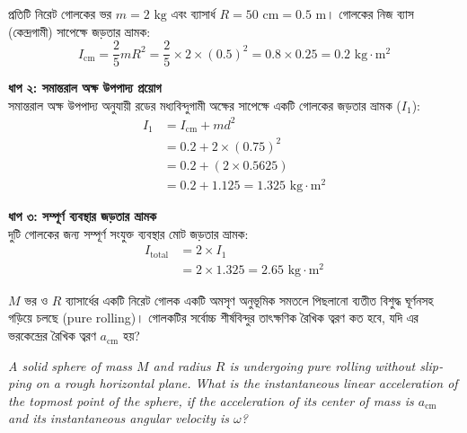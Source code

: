 \documentclass[12pt, a4paper]{article}
\begin{document}
{\begin{tcolorbox}[solutionbox={সমাধান (Solution)}]
    প্রতিটি নিরেট গোলকের ভর $m = 2\text{ kg}$ এবং ব্যাসার্ধ $R = 50\text{ cm} = 0.5\text{ m}$। 
    গোলকের নিজ ব্যাস (কেন্দ্রগামী) সাপেক্ষে জড়তার ভ্রামক:
    \[ I_{\text{cm}} = \frac{2}{5} m R^2 = \frac{2}{5} \times 2 \times (0.5)^2 = 0.8 \times 0.25 = 0.2\text{ kg}\cdot\text{m}^2 \]
    
    \vspace{0.5em}
    \noindent\textbf{ধাপ ২: সমান্তরাল অক্ষ উপপাদ্য প্রয়োগ} \\
    সমান্তরাল অক্ষ উপপাদ্য অনুযায়ী রডের মধ্যবিন্দুগামী অক্ষের সাপেক্ষে একটি গোলকের জড়তার ভ্রামক ($I_1$):
    \begin{align*}
        I_1 &= I_{\text{cm}} + m d^2 \\
            &= 0.2 + 2 \times (0.75)^2 \\
            &= 0.2 + (2 \times 0.5625) \\
            &= 0.2 + 1.125 = 1.325\text{ kg}\cdot\text{m}^2
    \end{align*}
    
    \vspace{0.5em}
    \noindent\textbf{ধাপ ৩: সম্পূর্ণ ব্যবস্থার জড়তার ভ্রামক} \\
    দুটি গোলকের জন্য সম্পূর্ণ সংযুক্ত ব্যবস্থার মোট জড়তার ভ্রামক:
    \begin{align*}
        I_{\text{total}} &= 2 \times I_1 \\
        &= 2 \times 1.325 = \mathbf{2.65}\text{ kg}\cdot\text{m}^2
    \end{align*}
\end{tcolorbox}

\newpage

\begin{tcolorbox}[questionbox={প্রশ্ন (Question) 7}]
    \noindent
    $M$ ভর ও $R$ ব্যাসার্ধের একটি নিরেট গোলক একটি অমসৃণ অনুভূমিক সমতলে পিছলানো ব্যতীত বিশুদ্ধ ঘূর্ণনসহ গড়িয়ে চলছে (pure rolling)। গোলকটির সর্বোচ্চ শীর্ষবিন্দুর তাৎক্ষণিক রৈখিক ত্বরণ কত হবে, যদি এর ভরকেন্দ্রের রৈখিক ত্বরণ $a_{\text{cm}}$ হয়?
    
    \vspace{0.8em}
    \begin{english}
    \noindent\textit{\color{darkgray}
    A solid sphere of mass $M$ and radius $R$ is undergoing pure rolling without slipping on a rough horizontal plane. What is the instantaneous linear acceleration of the topmost point of the sphere, if the acceleration of its center of mass is $a_{\text{cm}}$ and its instantaneous angular velocity is $\omega$?
    }
    \end{english}
\end{tcolorbox}

}
\end{document}
